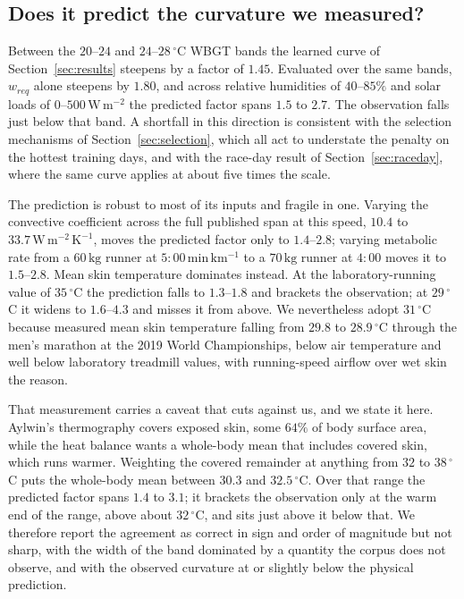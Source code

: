 \subsection{Does it predict the curvature we measured?}
\label{app:physics:curvature}

Between the $20$--$24$ and $24$--$28\,^{\circ}$C WBGT bands the learned curve of
Section~\ref{sec:results} steepens by a factor of $1.45$. Evaluated over the
same bands, $w_{req}$ alone steepens by $1.80$, and across relative humidities
of $40$--$85\%$ and solar loads of $0$--$500\,\mathrm{W\,m^{-2}}$ the predicted
factor spans $1.5$ to $2.7$. The observation falls just below that band. A shortfall
in this direction is consistent with the selection mechanisms of Section~\ref{sec:selection},
which all act to understate the penalty on the hottest training days, and with the race-day
result of Section~\ref{sec:raceday}, where the same curve applies at about five times the scale.

The prediction is robust to most of its inputs and fragile in one. Varying the
convective coefficient across the full published span at this speed, $10.4$ to
$33.7\,\mathrm{W\,m^{-2}\,K^{-1}}$, moves the predicted factor only to
$1.4$--$2.8$; varying metabolic rate from a $60\,\mathrm{kg}$ runner at
$5{:}00\,\mathrm{min\,km^{-1}}$ to a $70\,\mathrm{kg}$ runner at $4{:}00$ moves
it to $1.5$--$2.8$. Mean skin temperature dominates instead. At the
laboratory-running value of $35\,^{\circ}$C the prediction falls to $1.3$--$1.8$
and brackets the observation; at $29\,^{\circ}$C it widens to $1.6$--$4.3$ and misses it from above. We
nevertheless adopt $31\,^{\circ}$C because \citet{aylwin2023} measured mean skin temperature
falling from $29.8$ to $28.9\,^{\circ}$C through the men's marathon at the 2019
World Championships, below air temperature and well below laboratory treadmill
values, with running-speed airflow over wet skin the reason.

That measurement carries a caveat that cuts against us, and we state it here.
Aylwin's thermography covers exposed skin, some $64\%$ of body surface area,
while the heat balance wants a whole-body mean that includes covered skin, which
runs warmer. Weighting the covered remainder at anything from $32$ to
$38\,^{\circ}$C puts the whole-body mean between $30.3$ and $32.5\,^{\circ}$C.
Over that range the predicted factor spans $1.4$ to $3.1$; it brackets the observation
only at the warm end of the range, above about $32\,^{\circ}$C, and sits just above it below
that. We therefore report the agreement as correct in sign and order of magnitude but not
sharp, with the width of the band dominated by a quantity the corpus does not
observe, and with the observed curvature at or slightly below the physical prediction.

